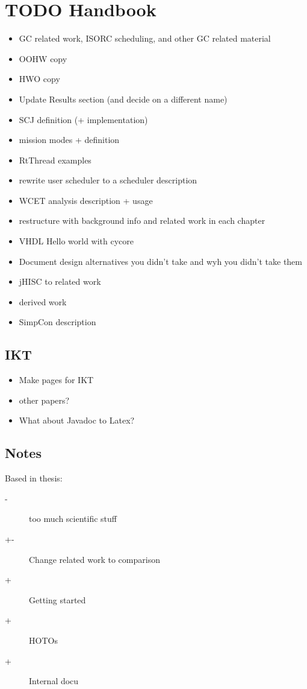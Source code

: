 \section{TODO Handbook}

\begin{itemize}
    \item GC related work, ISORC scheduling, and other GC related
    material
    \item OOHW copy
    \item HWO copy
    \item Update Results section (and decide on a different name)
    \item SCJ definition (+ implementation)
    \item mission modes + definition
    \item RtThread examples
    \item rewrite user scheduler to a scheduler description
    \item WCET analysis description + usage
    \item restructure with background info and related work in each
    chapter
    \item VHDL Hello world with cycore
    \item Document design alternatives you didn't take and wyh you
    didn't take them
    \item jHISC to related work
    \item derived work
    \item SimpCon description
\end{itemize}

\subsection{IKT}

\begin{itemize}
    \item Make pages for IKT
    \item other papers?
    \item What about Javadoc to Latex?
\end{itemize}
\subsection{Notes}

Based in thesis:
\begin{description}
    \item[-] too much scientific stuff
    \item[+-] Change related work to comparison
    \item[+] Getting started
    \item[+] HOTOs
    \item[+] Internal docu
\end{description}

